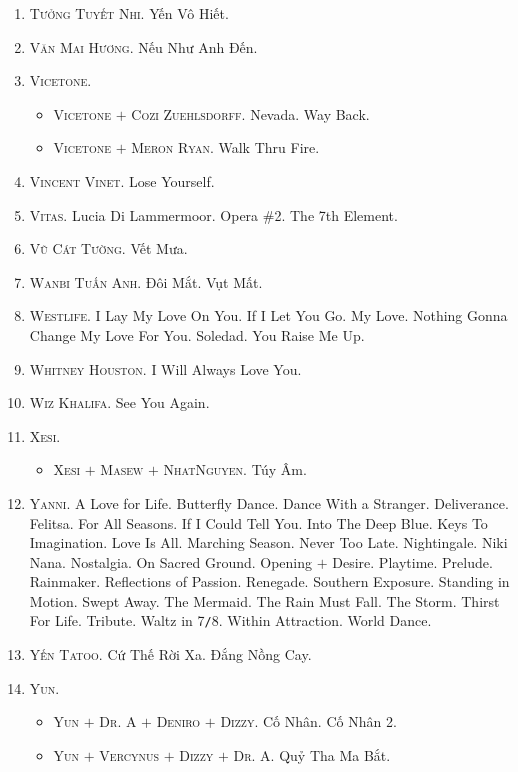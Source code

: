 \documentclass{article}
\numberwithin{equation}{section}
\begin{document}
\begin{enumerate}
	\item \textsc{Tưởng Tuyết Nhi.} Yến Vô Hiết.
	\item \textsc{Văn Mai Hương.} Nếu Như Anh Đến.
	\item \textsc{Vicetone.}
	\begin{itemize}
		\item \textsc{Vicetone $+$ Cozi Zuehlsdorff.} Nevada. Way Back.
		\item \textsc{Vicetone $+$ Meron Ryan.} Walk Thru Fire.
	\end{itemize}
	\item \textsc{Vincent Vinet.} Lose Yourself.
	\item \textsc{Vitas.} Lucia Di Lammermoor. Opera \#2. The 7th Element.
	\item \textsc{Vũ Cát Tường.} Vết Mưa.
	\item \textsc{Wanbi Tuấn Anh.} Đôi Mắt. Vụt Mất.
	\item \textsc{Westlife.} I Lay My Love On You. If I Let You Go. My Love. Nothing Gonna Change My Love For You. Soledad. You Raise Me Up.
	\item \textsc{Whitney Houston.} I Will Always Love You.
	\item \textsc{Wiz Khalifa.} See You Again.
	\item \textsc{Xesi.}
	\begin{itemize}
		\item \textsc{Xesi $+$ Masew $+$ NhatNguyen.} Túy Âm.
	\end{itemize}
	\item \textsc{Yanni.} A Love for Life. Butterfly Dance. Dance With a Stranger. Deliverance. Felitsa. For All Seasons. If I Could Tell You. Into The Deep Blue. Keys To Imagination. Love Is All. Marching Season. Never Too Late. Nightingale. Niki Nana. Nostalgia. On Sacred Ground. Opening $+$ Desire. Playtime. Prelude. Rainmaker. Reflections of Passion. Renegade. Southern Exposure. Standing in Motion. Swept Away. The Mermaid. The Rain Must Fall. The Storm. Thirst For Life. Tribute. Waltz in 7\texttt{/}8. Within Attraction. World Dance.
	\item \textsc{Yến Tatoo.} Cứ Thế Rời Xa. Đắng Nồng Cay.
	\item \textsc{Yun.}
	\begin{itemize}
		\item \textsc{Yun $+$ Dr. A $+$ Deniro $+$ Dizzy.} Cố Nhân. Cố Nhân 2.
		\item \textsc{Yun $+$ Vercynus $+$ Dizzy $+$ Dr. A.} Quỷ Tha Ma Bắt.
	\end{itemize}

\end{enumerate}
\end{document}
